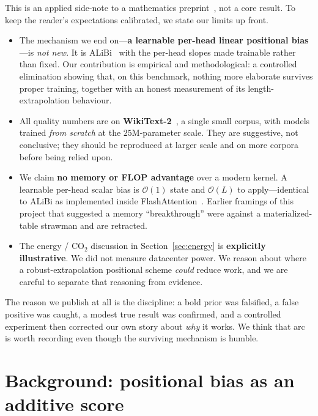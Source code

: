 \documentclass[11pt,a4paper]{article}
\begin{document}
This is an applied side-note to a mathematics preprint~\cite{mms}, not a core
result. To keep the reader's expectations calibrated, we state our limits up
front.

\begin{itemize}[leftmargin=1.4em,itemsep=2pt]
\item The mechanism we end on---\textbf{a learnable per-head linear positional
  bias}---is \emph{not new}. It is ALiBi~\cite{alibi} with the per-head slopes
  made trainable rather than fixed. Our contribution is empirical and
  methodological: a controlled elimination showing that, on this benchmark,
  nothing more elaborate survives proper training, together with an honest
  measurement of its length-extrapolation behaviour.
\item All quality numbers are on \textbf{WikiText-2}~\cite{wikitext}, a single
  small corpus, with models trained \emph{from scratch} at the $25$M-parameter
  scale. They are suggestive, not conclusive; they should be reproduced at
  larger scale and on more corpora before being relied upon.
\item We claim \textbf{no memory or FLOP advantage} over a modern kernel. A
  learnable per-head scalar bias is $\mathcal{O}(1)$ state and $\mathcal{O}(L)$
  to apply---identical to ALiBi as implemented inside
  FlashAttention~\cite{flash}. Earlier framings of this project that suggested a
  memory ``breakthrough'' were against a materialized-table strawman and are
  retracted.
\item The energy / $\mathrm{CO_2}$ discussion in
  Section~\ref{sec:energy} is \textbf{explicitly illustrative}. We did not
  measure datacenter power. We reason about where a robust-extrapolation
  positional scheme \emph{could} reduce work, and we are careful to separate that
  reasoning from evidence.
\end{itemize}

\noindent The reason we publish at all is the discipline: a bold prior was
falsified, a false positive was caught, a modest true result was confirmed, and a
controlled experiment then corrected our own story about \emph{why} it works. We
think that arc is worth recording even though the surviving mechanism is humble.

\section{Background: positional bias as an additive score}
\label{sec:bg}
\end{document}
